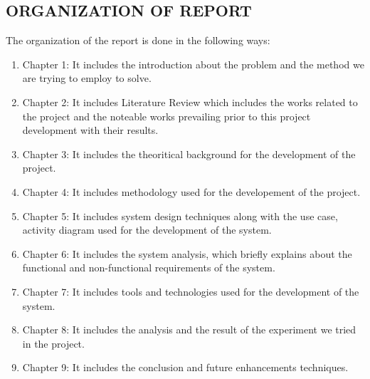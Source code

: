 \subsection{ORGANIZATION OF REPORT}
The organization of the report is done in the following ways:
\begin{enumerate}
\item Chapter 1: It includes the introduction about the problem and the method we are trying to employ to solve. 
\item Chapter 2: It includes Literature Review which includes the works related to the project and the noteable works prevailing prior to this project development with their results.
\item Chapter 3: It includes the theoritical background for the development of the project.
\item Chapter 4: It includes methodology used for the developement of the project.
\item Chapter 5: It includes system design techniques along with the use case, activity diagram used for the development of the system.
\item Chapter 6: It includes the system analysis, which briefly explains about the functional and non-functional requirements of the system.
\item Chapter 7: It includes tools and technologies used for the development of the system.
\item Chapter 8: It includes the analysis and the result of the experiment we tried in the project.
\item Chapter 9: It includes the conclusion and future enhancements techniques.
\end{enumerate}
